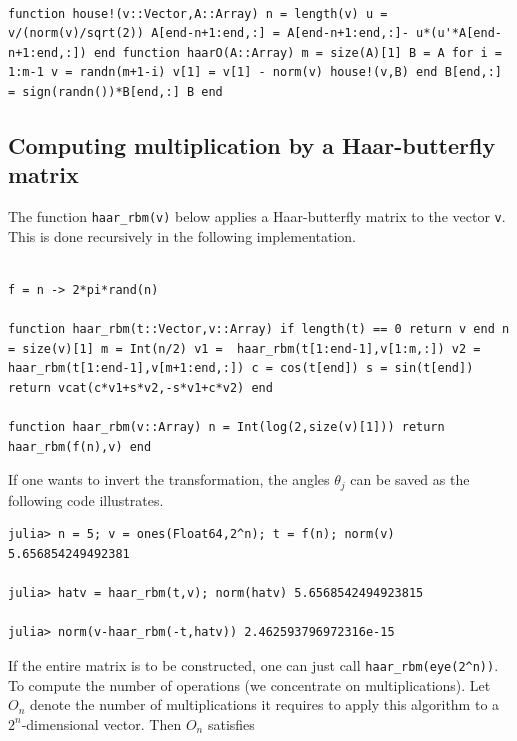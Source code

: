 \begin{lstlisting}[linewidth = \linewidth,frame = trBL]

function house!(v::Vector,A::Array) n = length(v) u = v/(norm(v)/sqrt(2)) A[end-n+1:end,:] = A[end-n+1:end,:]- u*(u'*A[end-n+1:end,:]) end function haarO(A::Array) m = size(A)[1] B = A for i = 1:m-1 v = randn(m+1-i) v[1] = v[1] - norm(v) house!(v,B) end B[end,:] = sign(randn())*B[end,:] B end
\end{lstlisting}

\subsection{Computing multiplication by a Haar-butterfly  matrix}\label{s:code_haarrbm}

The function {\tt haar\_rbm(v)} below applies a Haar-butterfly matrix to the vector {\tt v}.  This is done recursively in the following implementation.

\begin{lstlisting}[linewidth = \linewidth,frame = trBL]

f = n -> 2*pi*rand(n)

function haar_rbm(t::Vector,v::Array) if length(t) == 0 return v end n = size(v)[1] m = Int(n/2) v1 =  haar_rbm(t[1:end-1],v[1:m,:]) v2 =  haar_rbm(t[1:end-1],v[m+1:end,:]) c = cos(t[end]) s = sin(t[end]) return vcat(c*v1+s*v2,-s*v1+c*v2) end

function haar_rbm(v::Array) n = Int(log(2,size(v)[1])) return haar_rbm(f(n),v) end

\end{lstlisting}

If one wants to invert the transformation, the angles $\theta_j$ can be saved as the following code illustrates.

\begin{lstlisting}[linewidth = \linewidth,frame = trBL] julia> n = 5; v = ones(Float64,2^n); t = f(n); norm(v) 5.656854249492381

julia> hatv = haar_rbm(t,v); norm(hatv) 5.6568542494923815 

julia> norm(v-haar_rbm(-t,hatv)) 2.462593796972316e-15 
\end{lstlisting}

If the entire matrix is to be constructed, one can just call {\tt haar\_rbm(eye(2\string^n))}. To compute the number of operations (we concentrate on multiplications). Let $O_n$ denote the number of multiplications it requires to apply this algorithm to a $2^n$-dimensional vector.  Then $O_n$ satisfies


